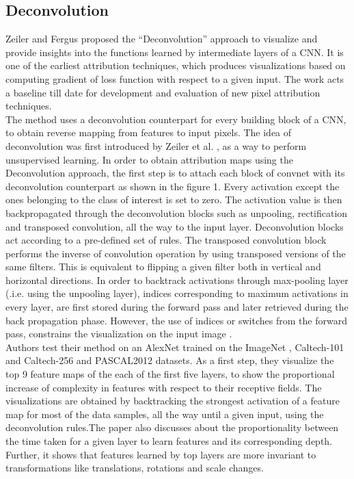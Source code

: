 \documentclass[../report.tex]{subfiles}
\begin{document}
    \subsection{Deconvolution}
    Zeiler and Fergus proposed the \enquote{Deconvolution}\cite{matthew2014visualizing} approach to visualize and provide insights into the functions learned by intermediate layers of a CNN. It is one of the earliest attribution techniques, which produces visualizations based on computing gradient of loss function with respect to a given input. The work acts a baseline till date for development and evaluation of new pixel attribution techniques.\\
    The method uses a deconvolution counterpart for every building block of a CNN, to obtain reverse mapping from features to input pixels. The idea of deconvolution was first introduced by Zeiler et al. \cite{zeiler2011adaptive}, as a way to perform unsupervised learning. In order to obtain attribution maps using the Deconvolution approach, the first step is to attach each block of convnet with its deconvolution counterpart as shown in the figure 1. Every activation except the ones belonging to the class of interest is set to zero. The activation value is then backpropagated through the deconvolution blocks such as unpooling, rectification and transposed convolution, all the way to the input layer. Deconvolution blocks act according to a pre-defined set of rules. The transposed convolution block performs the inverse of convolution operation by using transposed versions of the same filters. This is equivalent to flipping a given filter both in vertical and horizontal directions. In order to backtrack activations through max-pooling layer (.i.e. using the unpooling layer), indices corresponding to maximum activations in every layer, are first stored during the forward pass and later retrieved during the back propagation phase. However, the use of indices or switches from the forward pass, constrains the visualization on the input image \cite {guided_backprop}.\\ 
    Authors test their method on an AlexNet \cite{krizhevsky2012imagenet} trained on the ImageNet \cite{krizhevsky2012imagenet}, Caltech-101 \cite{caltech_101} and Caltech-256 \cite{caltech_256} and PASCAL2012 \cite{pascal-voc-2012} datasets. As a first step, they visualize the top 9 feature maps of the each of the first five layers, to show the proportional increase of complexity in features with respect to their receptive fields. The visualizations are obtained by backtracking the strongest activation of a feature map for most of the data samples, all the way until a given input, using the deconvolution rules.The paper also discusses about the proportionality between the time taken for a given layer to learn features and its corresponding depth. Further, it shows that features learned by top layers are more invariant to transformations like translations, rotations and scale changes.\\
\end{document}
